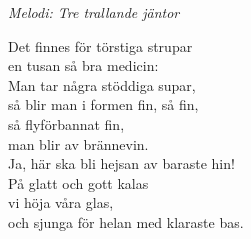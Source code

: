 {\footnotesize\textit{Melodi: Tre trallande jäntor}}\par
\vspace{10pt}
Det finnes för törstiga strupar\\
en tusan så bra medicin:\\
Man tar några stöddiga supar,\\
så blir man i formen fin, så fin,\\
så flyförbannat fin,\\
man blir av brännevin.\\
Ja, här ska bli hejsan av baraste hin!\\
På glatt och gott kalas\\
vi höja våra glas,\\
och sjunga för helan med klaraste bas.
